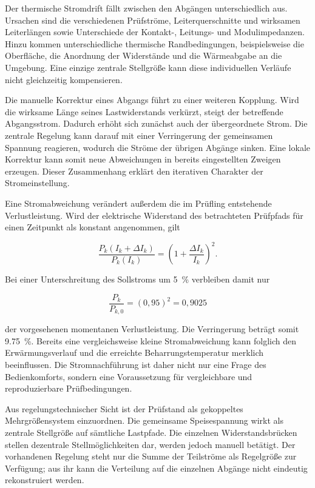 Der thermische Stromdrift fällt zwischen den Abgängen unterschiedlich aus.
Ursachen sind die verschiedenen Prüfströme, Leiterquerschnitte und wirksamen
Leiterlängen sowie Unterschiede der Kontakt-, Leitungs- und
Modulimpedanzen. Hinzu kommen unterschiedliche thermische Randbedingungen,
beispielsweise die Oberfläche, die Anordnung der Widerstände und die
Wärmeabgabe an die Umgebung. Eine einzige zentrale Stellgröße kann diese
individuellen Verläufe nicht gleichzeitig kompensieren.

Die manuelle Korrektur eines Abgangs führt zu einer weiteren Kopplung. Wird
die wirksame Länge seines Lastwiderstands verkürzt, steigt der betreffende
Abgangsstrom. Dadurch erhöht sich zunächst auch der übergeordnete Strom. Die
zentrale Regelung kann darauf mit einer Verringerung der gemeinsamen Spannung
reagieren, wodurch die Ströme der übrigen Abgänge sinken. Eine lokale
Korrektur kann somit neue Abweichungen in bereits eingestellten Zweigen
erzeugen. Dieser Zusammenhang erklärt den iterativen Charakter der
Stromeinstellung.

Eine Stromabweichung verändert außerdem die im Prüfling entstehende
Verlustleistung. Wird der elektrische Widerstand des betrachteten
Prüfpfads für einen Zeitpunkt als konstant angenommen, gilt

\begin{equation}
    \frac{P_k(I_k+\Delta I_k)}{P_k(I_k)}
    =
    \left(1+\frac{\Delta I_k}{I_k}\right)^2.
    \label{eq:ist_leistungsabweichung_stromabweichung}
\end{equation}

Bei einer Unterschreitung des Sollstroms um \SI{5}{\percent} verbleiben
damit nur

\begin{equation}
    \frac{P_k}{P_{k,0}}
    =
    (0{,}95)^2
    =
    0{,}9025
    \label{eq:ist_leistungsabweichung_beispiel}
\end{equation}

der vorgesehenen momentanen Verlustleistung. Die Verringerung beträgt somit
\SI{9.75}{\percent}. Bereits eine vergleichsweise kleine Stromabweichung kann
folglich den Erwärmungsverlauf und die erreichte Beharrungstemperatur
merklich beeinflussen. Die Stromnachführung ist daher nicht nur eine Frage
des Bedienkomforts, sondern eine Voraussetzung für vergleichbare und
reproduzierbare Prüfbedingungen.

Aus regelungstechnischer Sicht ist der Prüfstand als gekoppeltes
Mehrgrößensystem einzuordnen. Die gemeinsame Speisespannung wirkt als
zentrale Stellgröße auf sämtliche Lastpfade. Die einzelnen
Widerstandsbrücken stellen dezentrale Stellmöglichkeiten dar, werden jedoch
manuell betätigt. Der vorhandenen Regelung steht nur die Summe der
Teilströme als Regelgröße zur Verfügung; aus ihr kann die Verteilung auf die
einzelnen Abgänge nicht eindeutig rekonstruiert werden.

